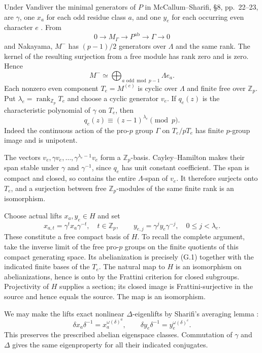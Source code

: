 Under Vandiver the minimal generators of $P$ in McCallum--Sharifi, \S8, pp.~22--23, are $\gamma$, one $x_a$ for each odd residue class $a$, and one $y_e$ for each occurring even character $e$ \cite{McCallumSharifi2003}. From
\[
 0\longrightarrow M_\Gamma\longrightarrow P^{\mathrm{ab}}
  \longrightarrow\Gamma\longrightarrow0
\]
and Nakayama, $M^-$ has $(p-1)/2$ generators over $\Lambda$ and the same rank. The kernel of the resulting surjection from a free module has rank zero and is zero. Hence
\[
 M^-\simeq\bigoplus_{a\text{ odd}\bmod p-1}\Lambda e_a.       \tag{G.1}
\]
Each nonzero even component $T_e=M^{(e)}$ is cyclic over $\Lambda$ and finite free over $\mathbb Z_p$. Put $\lambda_e=\operatorname{rank}_{\mathbb Z_p}T_e$ and choose a cyclic generator $v_e$. If $q_e(z)$ is the characteristic polynomial of $\gamma$ on $T_e$, then
\[
 q_e(z)\equiv(z-1)^{\lambda_e}\pmod p.                         \tag{G.2}
\]
Indeed the continuous action of the pro-$p$ group $\Gamma$ on $T_e/pT_e$ has finite $p$-group image and is unipotent.

The vectors $v_e,\gamma v_e,\ldots,\gamma^{\lambda_e-1}v_e$ form a $\mathbb Z_p$-basis. Cayley--Hamilton makes their span stable under $\gamma$ and $\gamma^{-1}$, since $q_e$ has unit constant coefficient. The span is compact and closed, so contains the entire $\Lambda$-span of $v_e$. It therefore surjects onto $T_e$, and a surjection between free $\mathbb Z_p$-modules of the same finite rank is an isomorphism.

Choose actual lifts $x_a,y_e\in H$ and set
\[
 x_{a,t}=\gamma^t x_a\gamma^{-t},\quad t\in\mathbb Z_p,
 \qquad y_{e,j}=\gamma^j y_e\gamma^{-j},\quad0\le j<\lambda_e.
\]
These constitute a free compact basis of $H$. To recall the complete argument, take the inverse limit of the free pro-$p$ groups on the finite quotients of this compact generating space. Its abelianization is precisely (G.1) together with the indicated finite bases of the $T_e$. The natural map to $H$ is an isomorphism on abelianizations, hence is onto by the Frattini criterion for closed subgroups. Projectivity of $H$ supplies a section; its closed image is Frattini-surjective in the source and hence equals the source. The map is an isomorphism.

We may make the lifts exact nonlinear $\Delta$-eigenlifts by Sharifi's averaging lemma \cite[Lemma~2.1, pp.~3--4]{Sharifi2002}:
\[
 \delta x_a\delta^{-1}=x_a^{\omega(\delta)^a},\qquad
 \delta y_e\delta^{-1}=y_e^{\omega(\delta)^e}.
\]
This preserves the prescribed abelian eigenspace classes. Commutation of $\gamma$ and $\Delta$ gives the same eigenproperty for all their indicated conjugates.

